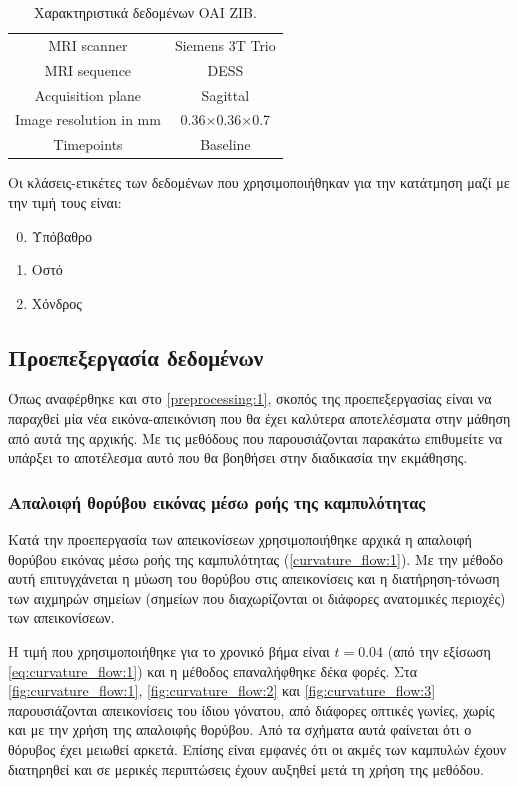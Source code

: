 \documentclass[a4paper,12pt]{article}
\begin{document}
\begin{table}[h!]
    \centering
    \begin{tabular}{|c|c|} 
        \hline
        MRI scanner            & Siemens 3T Trio \\ 
        MRI sequence           & DESS            \\
        Acquisition plane      & Sagittal        \\
        Image resolution in mm & 0.36×0.36×0.7   \\
        Timepoints             & Baseline        \\
        \hline
    \end{tabular}
    \caption{Χαρακτηριστικά δεδομένων OAI ZIB.}
    \label{dataset:1}
\end{table}

Οι κλάσεις-ετικέτες των δεδομένων που χρησιμοποιήθηκαν για την κατάτμηση μαζί με
την τιμή τους είναι:

\begin{enumerate}
    \setcounter{enumi}{-1} 
    \item Υπόβαθρο
    \item Οστό
    \item Χόνδρος
\end{enumerate}

\subsection{Προεπεξεργασία δεδομένων}

Όπως αναφέρθηκε και στο \ref{preprocessing:1}, σκοπός της προεπεξεργασίας είναι
να παραχθεί μία νέα εικόνα-απεικόνιση που θα έχει καλύτερα αποτελέσματα στην
μάθηση από αυτά της αρχικής. Με τις μεθόδους που παρουσιάζονται παρακάτω
επιθυμείτε να υπάρξει το αποτέλεσμα αυτό που θα βοηθήσει στην διαδικασία την
εκμάθησης.

\subsubsection{Απαλοιφή θορύβου εικόνας μέσω ροής της καμπυλότητας}

Κατά την προεπεργασία των απεικονίσεων χρησιμοποιήθηκε αρχικά η απαλοιφή θορύβου
εικόνας μέσω ροής της καμπυλότητας (\ref{curvature_flow:1}). Με την μέθοδο αυτή
επιτυγχάνεται η μύωση του θορύβου στις απεικονίσεις και η διατήρηση-τόνωση των
αιχμηρών σημείων (σημείων που διαχωρίζονται οι διάφορες ανατομικές περιοχές) των
απεικονίσεων.

Η τιμή που χρησιμοποιήθηκε για το χρονικό βήμα είναι $t=0.04$ (από την εξίσωση
\eqref{eq:curvature_flow:1}) και η μέθοδος επαναλήφθηκε δέκα φορές.  Στα
\autoref{fig:curvature_flow:1}, \autoref{fig:curvature_flow:2} και
\autoref{fig:curvature_flow:3} παρουσιάζονται απεικονίσεις του ίδιου γόνατου,
από διάφορες οπτικές γωνίες, χωρίς και με την χρήση της απαλοιφής θορύβου. Από
τα σχήματα αυτά φαίνεται ότι ο θόρυβος έχει μειωθεί αρκετά. Επίσης είναι εμφανές
ότι οι ακμές των καμπυλών έχουν διατηρηθεί και σε μερικές περιπτώσεις έχουν
αυξηθεί μετά τη χρήση της μεθόδου.
\end{document}
